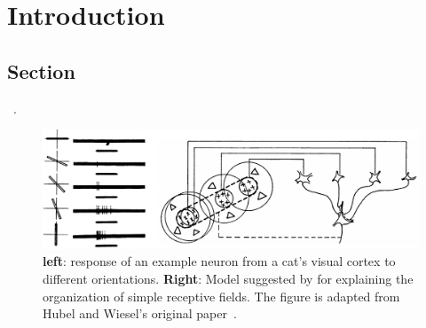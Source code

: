 \documentclass[../main.tex]{subfiles}
\begin{document}
\chapter{Introduction}
\label{chapter:intro}
\vspace{-10pt}

\section{Section}
\vspace{-10pt}

\lipsum[1]~\citep{hubel1962receptive}.

\begin{figure}[h!]
  \centering
  \includegraphics[width=1.\linewidth]{figures/intro_hubel_wiesel.pdf}
  \caption{\textbf{left}: response of an example neuron from a cat's visual cortex to different orientations. \textbf{Right}: Model suggested by \citet{hubel1962receptive} for explaining the organization of simple receptive fields. The figure is adapted from Hubel and Wiesel's original paper~\citep{hubel1962receptive}.}
  \label{fig:intro_hubel_wiesel}
\end{figure}

\biblio
\end{document}
